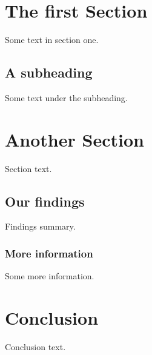 \tableofcontents
\newpage

\section{The first Section}
Some text in section one.

\subsection{A subheading}
Some text under the subheading.

\section{Another Section}
Section text.

\subsection{Our findings}
Findings summary.

\subsubsection{More information}
Some more information.

\section{Conclusion}
Conclusion text.
